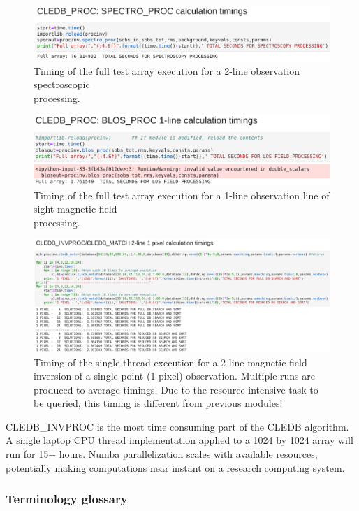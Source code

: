 \documentclass{article}
\begin{document}
 \begin{figure}[!h]
\includegraphics[width=0.65\columnwidth]{figs/calc_time_spectro.png}
\caption*{Timing of the full test array execution for a 2-line observation spectroscopic processing.~~~~~~~~~~~~~~~~~~~~~~~~~~~~~~~~~~~~~~~}
\end{figure} 

 \begin{figure}[!h]
\includegraphics[width=0.65\columnwidth]{figs/calc_time_blos.png}
\caption*{Timing of the full test array execution for a 1-line observation line of sight magnetic field processing.~~~~~~~~~~~~~~~~~~~~~~~~~~~~~~~~~~~~~}

\end{figure} 
 \begin{figure}[!h]
\includegraphics[width=0.85\columnwidth]{figs/calc_time_1pix.png}
\caption*{Timing of the single thread execution for a 2-line magnetic field inversion of a single point (1 pixel) observation. Multiple runs are produced to average timings. Due to the resource intensive task to be queried, this timing is different from previous modules!}
\end{figure} 

CLEDB\_INVPROC is the most time consuming part of the CLEDB algorithm. A single laptop CPU thread implementation applied to a 1024 by 1024 array will run for 15+ hours. Numba parallelization scales with available resources, potentially making computations near instant on a research computing system.  

\newpage

\subsubsection*{Terminology glossary} 
\end{document}

